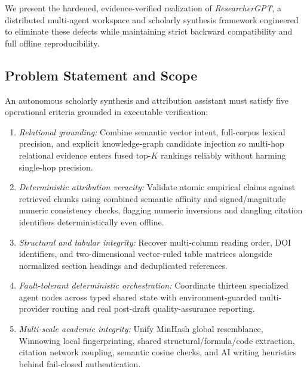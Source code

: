 \documentclass[conference]{IEEEtran}
\begin{document}
We present the hardened, evidence-verified realization of \emph{ResearcherGPT}, a distributed multi-agent workspace and scholarly synthesis framework engineered to eliminate these defects while maintaining strict backward compatibility and full offline reproducibility.

\subsection{Problem Statement and Scope}
An autonomous scholarly synthesis and attribution assistant must satisfy five operational criteria grounded in executable verification:
\begin{enumerate}
  \item \emph{Relational grounding:} Combine semantic vector intent, full-corpus lexical precision, and explicit knowledge-graph candidate injection so multi-hop relational evidence enters fused top-$K$ rankings reliably without harming single-hop precision.
  \item \emph{Deterministic attribution veracity:} Validate atomic empirical claims against retrieved chunks using combined semantic affinity and signed/magnitude numeric consistency checks, flagging numeric inversions and dangling citation identifiers deterministically even offline.
  \item \emph{Structural and tabular integrity:} Recover multi-column reading order, DOI identifiers, and two-dimensional vector-ruled table matrices alongside normalized section headings and deduplicated references.
  \item \emph{Fault-tolerant deterministic orchestration:} Coordinate thirteen specialized agent nodes across typed shared state with environment-guarded multi-provider routing and real post-draft quality-assurance reporting.
  \item \emph{Multi-scale academic integrity:} Unify MinHash global resemblance, Winnowing local fingerprinting, shared structural/formula/code extraction, citation network coupling, semantic cosine checks, and AI writing heuristics behind fail-closed authentication.
\end{enumerate}
\end{document}
